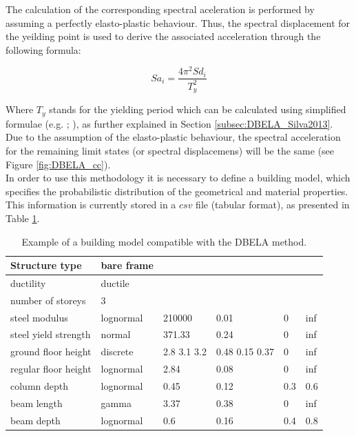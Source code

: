 The calculation of the corresponding spectral aceleration is performed by assuming a perfectly elasto-plastic behaviour. Thus, the spectral displacement for the yeilding point is used to derive the associated acceleration through the following formula:

\begin{equation}
Sa_i = \frac{4\pi^2Sd_i}{T_y^2}
\end{equation}

Where $T_y$ stands for the yielding period which can be calculated using simplified formulae (e.g. \cite{CrowleyPinho2004}; \cite{CrowleyPinho2006}), as further explained in Section \ref{subsec:DBELA_Silva2013}. Due to the assumption of the elasto-plastic behaviour, the spectral acceleration for the remaining limit states (or spectral displacemens) will be the same (see Figure \ref{fig:DBELA_cc}). \\ 

In order to use this methodology it is necessary to define a building model, which specifies the probabilistic distribution of the geometrical and material properties. This information is currently stored in a $csv$ file (tabular format), as presented in Table \ref{table:building_model}.
 
\begin {table}[htb]
\caption{Example of a building model compatible with the DBELA method.} 
\label{table:building_model} 
\begin{center}
  \begin{tabular}{ | l | l | l | l | l | l |}
  \hline
Structure type & bare frame &  &  &  &  \\ \hline
ductility & ductile &  &  &  &  \\ \hline
number of storeys & 3 &  &  &  &  \\ \hline
steel modulus & lognormal & 210000 & 0.01 & 0 & inf \\ \hline
steel yield strength & normal & 371.33 & 0.24 & 0 & inf \\ \hline
ground floor height & discrete & 2.8 3.1 3.2 & 0.48 0.15 0.37 & 0 & inf \\ \hline
regular floor height & lognormal & 2.84 & 0.08 & 0 & inf \\ \hline
column depth & lognormal & 0.45 & 0.12 & 0.3 & 0.6 \\ \hline
beam length & gamma & 3.37 & 0.38 & 0 & inf \\ \hline
beam depth & lognormal & 0.6 & 0.16 & 0.4 & 0.8 \\ \hline
  \end{tabular}
\end{center}
\end{table}

